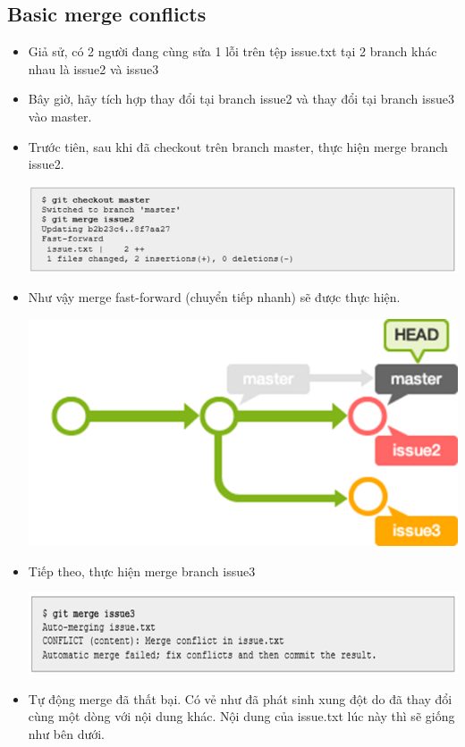 \documentclass[12pt,a4paper]{report}
\begin{document}
\subsection{Basic merge conflicts}
\begin{itemize}
\item Giả sử, có 2 người đang cùng sửa 1 lỗi trên tệp issue.txt tại 2 branch khác nhau là issue2 và issue3	
\item Bây giờ, hãy tích hợp thay đổi tại branch issue2 và thay đổi tại branch issue3 vào master.
\item Trước tiên, sau khi đã checkout trên branch master, thực hiện merge branch issue2.	

	\includegraphics[width=0.8\linewidth]{screenshot03}

	\label{fig:screenshot03}
	
\item Như vậy merge fast-forward (chuyển tiếp nhanh) sẽ được thực hiện.	

	\includegraphics[width=0.8\linewidth]{screenshot063}

	\label{fig:screenshot063}
	
\item Tiếp theo, thực hiện merge branch issue3	

	\includegraphics[width=0.8\linewidth]{screenshot04}

	\label{fig:screenshot04}

\item Tự động merge đã thất bại. Có vẻ như đã phát sinh xung đột do đã thay đổi cùng một dòng với nội dung khác. Nội dung của issue.txt lúc này thì sẽ giống như bên dưới.


\end{itemize}
\end{document}
